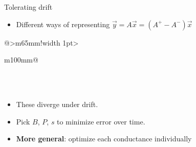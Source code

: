 \documentclass[aspectratio=169,professionalfonts,12pt]{beamer}
\begin{document}
\begin{frame}{Tolerating drift}
  \begin{itemize}
  \item<1-> Different ways of representing $\vec{y}=A\vec{x}=(A^+-A^-)\vec{x}$
  \end{itemize}
  \par\vspace{3mm}
  \small {
    \renewcommand{\arraystretch}{1.5}
    \begin{tabular}{@{}>{\raggedleft\color{navy}}m{65mm}!{\color{copper}\vrule width 1pt\hspace{0mm}}>{\raggedright\arraybackslash}m{100mm}@{}}
      \\
      \\
    \end{tabular}
  }
  \begin{itemize}
  \item<5-> These diverge under drift.
  \item<6-> Pick $B$, $P$, $s$ to minimize error over time.
  \item<7-> \textbf{More general}: optimize each conductance individually
  \end{itemize}
\end{frame}
\end{document}
